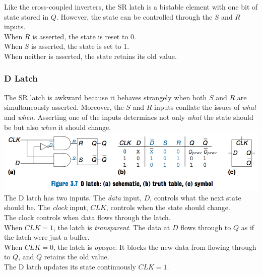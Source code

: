 \documentclass[12pt]{article}
\theoremstyle{definition}
\begin{document}
  Like the cross-coupled inverters, the SR latch is a bistable element with one bit of state stored in $Q$.
  However, the state can be controlled through the $S$ and $R$ inputs. \\
  When $R$ is asserted, the state is reset to 0. \\
  When $S$ is asserted, the state is set to 1. \\
  When neither is asserted, the state retains its old value.

  \subsubsection{D Latch}
  The SR latch is awkward because it behaves strangely when both $S$ and $R$ are simultaneously asserted.
  Moreover, the $S$ and $R$ inputs conflate the issues of \emph{what} and \emph{when}.
  Asserting one of the inputs determines not only \emph{what} the state should be but also \emph{when} it should change. \\
  \includegraphics[width=1.0\textwidth]{pictures/dLatch.png}\\
  The D latch has two inputs.
  The \emph{data} input, $D$, controls what the next state should be.
  The \emph{clock} input, $CLK$, controls when the state should change. \\
  The clock controls when data flows through the latch. \\
  When $CLK = 1$, the latch is \emph{transparent}.
  The data at $D$ flows through to $Q$ as if the latch were just a buffer. \\
  When $CLK = 0$, the latch is \emph{opaque}.
  It blocks the new data from flowing through to $Q$, and $Q$ retains the old value. \\
  The D latch updates its state continuously $CLK = 1$.
  \newpage
\end{document}
